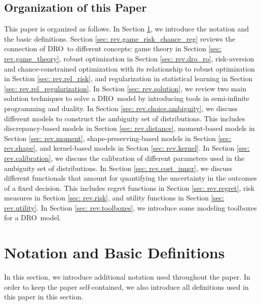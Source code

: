 \documentclass[final,onefignum,onetabnum]{class}
\newcommand{\dro}{DRO}
\begin{document}
\subsection{Organization of this Paper}
This paper is organized as follows. 
In Section \ref{sec: rev.notation}, we introduce the notation and the basic definitions. %
Section \ref{sec: rev.game_risk_chance_reg}  reviews the connection of \dro\ to different concepts: game theory in Section \ref{sec: rev.game_theory}, robust optimization in Section \ref{sec: rev.dro_ro}, risk-aversion and chance-constrained optimization with its relationship to robust optimization in Section \ref{sec: rev.rel_risk}, and regularization in statistical learning in Section \ref{sec: rev.rel_regularization}. In Section \ref{sec: rev.solution}, we review two main solution techniques to solve a \dro\ model by introducing tools in semi-infinite programming and duality. 
In Section \ref{sec: rev.choice.ambiguity}, we discuss different models to construct the ambiguity set of distributions. This includes discrepancy-based models in Section \ref{sec: rev.distance}, moment-based models in Section \ref{sec: rev.moment}, shape-preserving-based models in Section \ref{sec: rev.shape}, and kernel-based models in Section  \ref{sec: rev.kernel}. 
In Section \ref{sec: rev.calibration}, we discuss the calibration of different parameters used in the ambiguity set of distributions. In Section \ref{sec: rev.cost_inner}, we discuss different functionals  that amount for quantifying the uncertainty in the outcomes of a fixed decision. This includes  regret functions in Section \ref{sec: rev.regret}, risk measures in Section \ref{sec: rev.risk}, and utility functions in Section \ref{sec: rev.utility}. In Section \ref{sec: rev.toolboxes}, we introduce some modeling toolboxes for a \dro\ model. %



\section{Notation and Basic Definitions}
\label{sec: rev.notation}
In this section, we introduce  additional  notation  used throughout the paper. In order to keep the paper self-contained, we also introduce all definitions used in this paper in this section.
\end{document}

